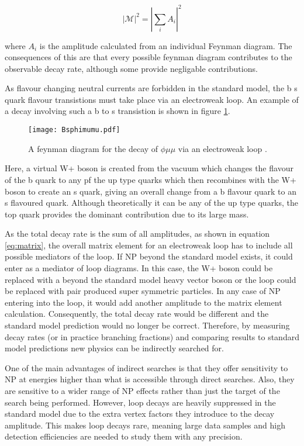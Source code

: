 \begin{equation}
  \label{eq:matrix}
  |\mathscr{M}|^2=|\sum_i A_i|^2
\end{equation}

where $A_i$ is the amplitude calculated from an individual Feynman diagram.  The consequences of this are that every possible feynman diagram contributes to the observable decay rate, although some provide negligable contributions.

As flavour changing neutral currents are forbidden in the standard model, the b \to s quark flavour transistions must take place via an electroweak loop.  An example of a decay involving such a b to s transistion is shown in figure \ref{fig:btos}.

\begin{figure}
  \centering
  \texttt{[image: Bsphimumu.pdf]}
  \caption{A feynman diagram for the decay of \Bs \to $\phi \mu \mu$ via an electroweak loop \cite{LHCb-PAPER-2013-017}.}
  \label{fig:btos}
\end{figure}

Here, a virtual W+ boson is created from the vacuum which changes the flavour of the b quark to any pf the up type quarks which then recombines with the W+ boson to create an s quark, giving an overall change from a b flavour quark to an s flavoured quark.  Although theoretically it can be any of the up type quarks, the top quark provides the dominant contribution due to its large mass.

As the total decay rate is the sum of all amplitudes, as shown in equation \ref{eq:matrix}, the overall matrix element for an electroweak loop has to include all possible mediators of the loop.  If NP beyond the standard model exists, it could enter as a mediator of loop diagrams.  In this case, the W+ boson could be replaced with a beyond the standard model heavy vector boson or the loop could be replaced with pair produced super symmetric particles.  In any case of NP entering into the loop, it would add another amplitude to the matrix element calculation.  Consequently, the total decay rate would be different and the standard model prediction would no longer be correct.  Therefore, by measuring decay rates (or in practice branching fractions) and comparing results to standard model predictions new physics can be indirectly searched for.

One of the main advantages of indirect searches is that they offer sensitivity to NP at energies higher than what is accessible through direct searches.  Also, they are sensitive to a wider range of NP effects rather than just the target of the search being performed.  However, loop decays are heavily suppressed in the standard model due to the extra vertex factors they introduce to the decay amplitude.  This makes loop decays rare, meaning large data samples and high detection efficiencies are needed to study them with any precision.








